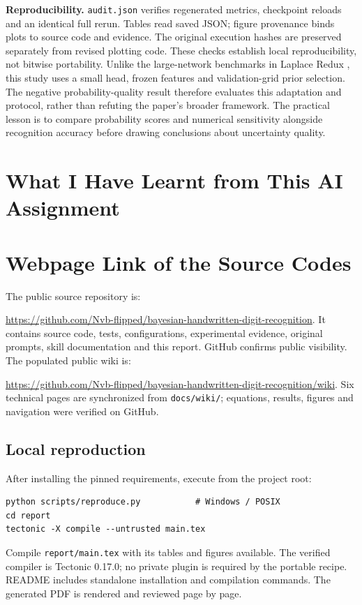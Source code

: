 \documentclass[10pt,a4paper]{article}
\begin{document}
\textbf{Reproducibility.} \texttt{audit.json} verifies regenerated metrics,
checkpoint reloads and an identical full rerun. Tables read saved JSON;
figure provenance binds plots to source code and evidence. The original
execution hashes are preserved separately from revised plotting code.
These checks establish local reproducibility, not bitwise portability.
Unlike the large-network benchmarks in Laplace Redux \cite{laplace}, this study
uses a small head, frozen features and validation-grid prior selection.
The negative probability-quality result therefore evaluates this adaptation
and protocol, rather than refuting the paper's broader framework. The practical
lesson is to compare probability scores and numerical sensitivity alongside
recognition accuracy before drawing conclusions about uncertainty quality.


\FloatBarrier
\section{What I Have Learnt from This AI Assignment}


\clearpage
\section{Webpage Link of the Source Codes}
The public source repository is:

\url{https://github.com/Nvb-flipped/bayesian-handwritten-digit-recognition}.
It contains source code, tests, configurations, experimental evidence, original
prompts, skill documentation and this report. GitHub confirms public visibility.
The populated public wiki is:

\url{https://github.com/Nvb-flipped/bayesian-handwritten-digit-recognition/wiki}.
Six technical pages are synchronized from \texttt{docs/wiki/}; equations,
results, figures and navigation were verified on GitHub.

\subsection*{Local reproduction}
After installing the pinned requirements, execute from the project root:
\begin{verbatim}
python scripts/reproduce.py           # Windows / POSIX
cd report
tectonic -X compile --untrusted main.tex
\end{verbatim}
Compile \texttt{report/main.tex} with its tables and figures available.
The verified compiler is Tectonic 0.17.0; no private plugin is required by the portable recipe.
README includes standalone installation and compilation commands.
The generated PDF is rendered and reviewed page by page.
\end{document}
